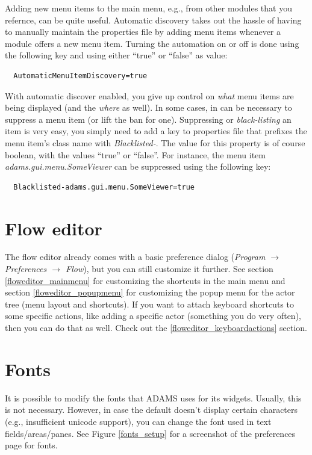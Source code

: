 Adding new menu items to the main menu, e.g., from other modules that you 
refernce, can be quite useful. Automatic discovery takes out the hassle of
having to manually maintain the properties file by adding menu items whenever 
a module offers a new menu item. Turning the automation on or off is done using
the following key and using either ``true'' or ``false'' as value:
\begin{verbatim}
  AutomaticMenuItemDiscovery=true
\end{verbatim}

With automatic discover enabled, you give up control on \textit{what} menu 
items are being displayed (and the \textit{where} as well). In some cases, 
in can be necessary to suppress a menu item (or lift the ban for one).
Suppressing or \textit{black-listing} an item is very easy, you simply need
to add a key to properties file that prefixes the menu item's class name 
with \textit{Blacklisted-}. The value for this property is of course boolean,
with the values ``true'' or ``false''. For instance, the menu item 
\textit{adams.gui.menu.SomeViewer} can be suppressed using the following key:
\begin{verbatim}
  Blacklisted-adams.gui.menu.SomeViewer=true
\end{verbatim}

\section{Flow editor}
The flow editor already comes with a basic preference dialog (\textit{Program 
$\rightarrow$ Preferences $\rightarrow$ Flow}), but you can still customize it further.
See section \ref{floweditor_mainmenu} for customizing the shortcuts in the 
main menu and section \ref{floweditor_popupmenu} for customizing the popup
menu for the actor tree (menu layout and shortcuts). If you want to attach
keyboard shortcuts to some specific actions, like adding a specific actor
(something you do very often), then you can do that as well. Check out the
\ref{floweditor_keyboardactions} section.

\section{Fonts}
It is possible to modify the fonts that ADAMS uses for its widgets. Usually,
this is not necessary. However, in case the default doesn't display certain
characters (e.g., insufficient unicode support), you can change the font
used in text fields/areas/panes. See Figure \ref{fonts_setup} for a screenshot
of the preferences page for fonts.


